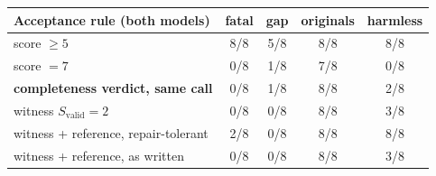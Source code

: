 \begin{tabular}{@{}lcccc@{}}
\toprule
Acceptance rule (both models) & fatal & gap & originals & harmless \\
\midrule
score $\ge 5$ & 8/8 & 5/8 & 8/8 & 8/8 \\
score $=7$ & 0/8 & 1/8 & 7/8 & 0/8 \\
\textbf{completeness verdict, same call} & 0/8 & 1/8 & 8/8 & 2/8 \\
witness $S_{\mathrm{valid}}{=}2$ & 0/8 & 0/8 & 8/8 & 3/8 \\
witness + reference, repair-tolerant & 2/8 & 0/8 & 8/8 & 8/8 \\
witness + reference, as written & 0/8 & 0/8 & 8/8 & 3/8 \\
\bottomrule
\end{tabular}
